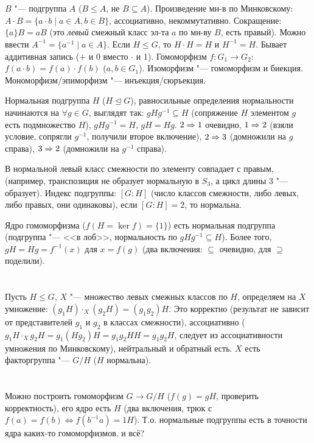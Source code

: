 \section{} %
$B$ "--- подгруппа $A$ ($B \le A$, не $B \subseteq A$).
Произведение мн-в по Минковскому: $A\cdot B=\{a \cdot b \mid a \in A, b \in B \}$, ассоциативно, некоммутативно.
Сокращение: $\{a\}B = aB$ (это \textit{левый} смежный класс эл-та $a$ по мн-ву $B$, есть правый).
Можно ввести $A^{-1}=\{a^{-1}\mid a \in A\}$.
Если $H \le G$, то $H\cdot H = H$ и $H^{-1}=H$.
Бывает аддитивная запись ($+$ и 0 вместо $\cdot$ и 1).
Гомоморфизм $f \colon G_1 \to G_2$: $f(a\cdot b) = f(a) \cdot f(b)$ ($a, b \in G_1$).
Изоморфизм "--- гомоморфизм и биекция.
Мономорфизм/эпиморфизм "--- инъекция/сюръекция.

Нормальная подгруппа $H$ ($H \unlhd G$), равносильные определения нормальности начинаются на $\forall g \in G$,
выглядят так: $gHg^{-1} \subseteq H$ (сопряжение $H$ элементом $g$ есть подмножество $H$), $gHg^{-1} = H$, $gH=Hg$.
$2\Rightarrow 1$ очевидно, $1\Rightarrow 2$ (взяли условие, сопрягли $g^{-1}$, получили второе включение),
$2 \Rightarrow 3$ (домножили на $g$ справа), $3 \Rightarrow 2$ (домножили на $g^{-1}$ справа).

В нормальной левый класс смежности по элементу совпадает с правым, (например, транспозиция не образует
нормальную в $S_3$, а цикл длины 3 "--- образует).
Индекс подгруппы: $[G:H]$ (число классов смежности, либо левых, либо правых, они одинаковы),
если $[G:H]=2$, то нормальна.

Ядро гомоморфизма ($f(H=\ker f)=\{1\}$) есть нормальная подгруппа (подгруппа "--- <<в лоб>>,
нормальность по $gHg^{-1} \subseteq H$).
Более того, $gH=Hg=f^{-1}(x)$ для $x=f(g)$ (два включения: $\subseteq$ очевидно, для $\supseteq$
поделили).

\section{} %
Пусть $H \le G$, $X$ "--- множество левых смежных классов по $H$,
определяем на $X$ умножение: $(g_1H)\cdot_X(g_2H)=(g_1g_2)H$.
Это корректно (результат не зависит от представителей $g_1$ и $g_2$ в классах
смежности), ассоциативно ($g_1H\cdot_X g_2H = g_1(Hg_2)H=g_1g_2HH=g_1g_2H$,
следует из ассоциативности умножения по Минковскому), нейтральный и обратный есть.
$X$ есть факторгруппа "--- $G / H$ ($H$ нормальна).

\section{} %
Можно построить гомоморфизм $G \to G / H$ ($f(g)=gH$, проверить корректность),
его ядро есть $H$ (два включения, трюк с $f(a)=f(b) \iff f(b^{-1}a) = 1H$).
Т.о. нормальные подгруппы есть в точности ядра каких-то гомоморфизмов.
\TODO и всё?

